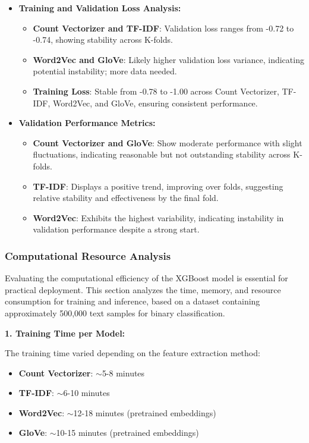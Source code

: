 \begin{itemize}
    \item \textbf{Training and Validation Loss Analysis:}
    \begin{itemize}
        \item \textbf{Count Vectorizer and TF-IDF}: Validation loss ranges from -0.72 to -0.74, showing stability across K-folds.
        \item \textbf{Word2Vec and GloVe}: Likely higher validation loss variance, indicating potential instability; more data needed.
        \item \textbf{Training Loss}: Stable from -0.78 to -1.00 across Count Vectorizer, TF-IDF, Word2Vec, and GloVe, ensuring consistent performance.
    \end{itemize}
    
    \item \textbf{Validation Performance Metrics:}
    \begin{itemize}
        \item \textbf{Count Vectorizer and GloVe}: Show moderate performance with slight fluctuations, indicating reasonable but not outstanding stability across K-folds.
        \item \textbf{TF-IDF}: Displays a positive trend, improving over folds, suggesting relative stability and effectiveness by the final fold.
        \item \textbf{Word2Vec}: Exhibits the highest variability, indicating instability in validation performance despite a strong start.
    \end{itemize}
\end{itemize}

\subsubsection{Computational Resource Analysis}

Evaluating the computational efficiency of the XGBoost model is essential for practical deployment. This section analyzes the time, memory, and resource consumption for training and inference, based on a dataset containing approximately 500,000 text samples for binary classification.

\textbf{1. Training Time per Model:}

The training time varied depending on the feature extraction method:

\begin{itemize}
\item \textbf{Count Vectorizer}: $\sim$5-8 minutes
\item \textbf{TF-IDF}: $\sim$6-10 minutes
\item \textbf{Word2Vec}: $\sim$12-18 minutes (pretrained embeddings)
\item \textbf{GloVe}: $\sim$10-15 minutes (pretrained embeddings)
\end{itemize}

